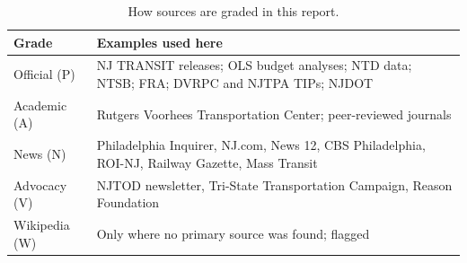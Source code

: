\documentclass[11pt]{article}
\begin{document}
\begin{table}[ht]\centering\small
\begin{tabularx}{\textwidth}{@{}lL@{}}
\toprule
Grade & Examples used here \\
\midrule
Official (P) & NJ TRANSIT releases; OLS budget analyses; NTD data; NTSB; FRA; DVRPC and NJTPA TIPs; NJDOT \\
Academic (A) & Rutgers Voorhees Transportation Center; peer-reviewed journals \\
News (N) & Philadelphia Inquirer, NJ.com, News 12, CBS Philadelphia, ROI-NJ, Railway Gazette, Mass Transit \\
Advocacy (V) & NJTOD newsletter, Tri-State Transportation Campaign, Reason Foundation \\
Wikipedia (W) & Only where no primary source was found; flagged \\
\bottomrule
\end{tabularx}
\caption{How sources are graded in this report.}
\end{table}

\end{document}
